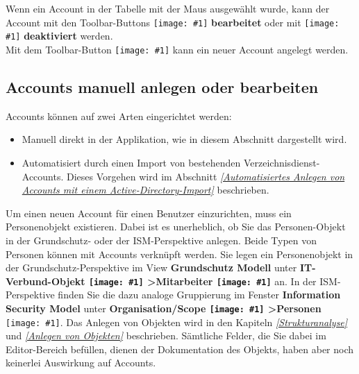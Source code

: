 \documentclass[a4paper,10pt]{book}
\newcommand{\icon}[1]{\texttt{[image: \#1]}}
\begin{document}
Wenn ein Account in der Tabelle mit der Maus ausgewählt wurde, kann der Account mit den Toolbar-Buttons \icon{Icon/Edit.png} \textbf{bearbeitet} oder mit \icon{Icon/user_disabled.png} \textbf{deaktiviert} werden.
\newline\\
Mit dem Toolbar-Button \icon{Icon/user_add.png} kann ein neuer Account angelegt werden.

\subsection{Accounts manuell anlegen oder bearbeiten} \label{sec:accounts-anlegen}
Accounts können auf zwei Arten eingerichtet werden:
\begin{itemize}
\item Manuell direkt in der Applikation, wie in diesem Abschnitt dargestellt wird.
\item Automatisiert durch einen Import von bestehenden Verzeichnisdienst-Accounts. Dieses Vorgehen wird im Abschnitt
{\em \ref{Automatisiertes Anlegen von Accounts mit einem Active-Directory-Import} } beschrieben.
\end{itemize}
Um einen neuen Account für einen Benutzer einzurichten, muss ein Personenobjekt existieren. Dabei ist es unerheblich, ob Sie das Personen-Objekt in der Grundschutz- oder der ISM-Perspektive anlegen. Beide Typen von Personen können mit Accounts verknüpft werden. Sie legen ein Personenobjekt in der Grundschutz-Perspektive im View \textbf{Grundschutz Modell} unter \textbf{IT-Verbund-Objekt
\icon{Icon/GS_Modell.png} \textgreater Mitarbeiter \icon{Icon/Mitarbeiter.png}} an. In der
ISM-Perspektive finden Sie die dazu analoge Gruppierung im Fenster \textbf{Information Security Model} unter
\textbf{Organisation/Scope \icon{Icon/GS_Modell.png} \textgreater Personen} \icon{Icon/Mitarbeiter.png}. Das Anlegen von Objekten wird in den Kapiteln {\em \ref{Strukturanalyse} } und
{\em \ref{Anlegen von Objekten} } beschrieben. Sämtliche Felder, die Sie dabei im Editor-Bereich befüllen, dienen der Dokumentation des Objekts, haben aber noch keinerlei Auswirkung auf Accounts.
\newline\\
\end{document}
